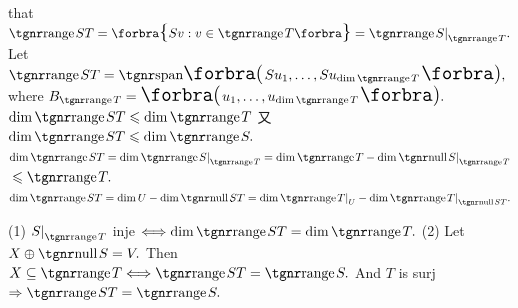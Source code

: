 \NOTICE that \uline{$\range ST=\Bra{Sv:v\in\range T}=\range S\mmid_{\range T}.$}\parSol{}
Let $\range ST=\Span[\BigPar]{Su_1,\dots,Su_{\dim\range T}},$ where $B_{\range T}=\BigPar{u_1,\dots,u_{\dim\range T}}.$\parSol{}
$\dim\range ST\leqslant \dim\range T$
又 $\dim\range ST\leqslant \dim\range S.$\PfEnd\parSol{\vspace{4pt}}
\Or \uline{$\dim\range ST=\dim\range S\mmid_{\range T}=\dim\range T-\dim\null S\mmid_{\range T}$}${}\leqslant \range T.$\PfEnd\parSol{}
\AComm $\dim\range ST=\dim U-\dim\null ST=\dim \range T\mmid_{U}-\dim\range T\mmid_{\null ST}.$\par\vspace{4pt}
\ACoro (1) $S\mmid_{\range T}$ inje $\Longleftrightarrow\dim\range ST=\dim\range T.$\parCor
(2) Let $X\oplus\null S=V.$ Then $X\subseteq\range T\Longleftrightarrow\range ST=\range S.$\vspace{-2pt}\parCor
{} And $T$ is surj $\Rightarrow\range ST=\range S.$
\SepLine

